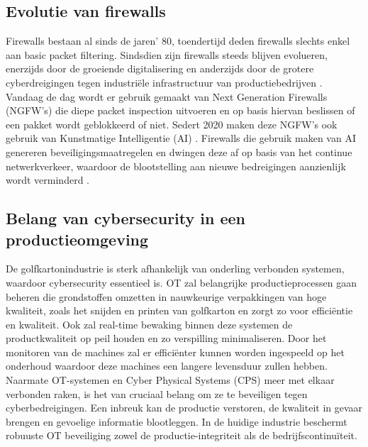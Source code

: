 \subsection{Evolutie van firewalls}
Firewalls bestaan al sinds de jaren’ 80, toendertijd deden firewalls slechts enkel aan basic packet filtering. Sindsdien zijn firewalls steeds blijven evolueren, enerzijds door de groeiende digitalisering en anderzijds door de grotere cyberdreigingen tegen industriële infrastructuur van productiebedrijven \autocite{Wusteney2021}. 
Vandaag de dag wordt er gebruik gemaakt van Next Generation Firewalls (NGFW’s) die diepe packet inspection uitvoeren en op basis hiervan beslissen of een pakket wordt geblokkeerd of niet. Sedert 2020 maken deze NGFW’s ook gebruik van Kunstmatige Intelligentie (AI) \textcite{Ahmadi2023}. Firewalls die gebruik maken van AI genereren beveiligingsmaatregelen en dwingen deze af op basis van het continue netwerkverkeer, waardoor de blootstelling aan nieuwe bedreigingen aanzienlijk wordt verminderd \textcite{PaloAltoFW2024}.

  
\subsection{Belang van cybersecurity in een productieomgeving}

De golfkartonindustrie is sterk afhankelijk van onderling verbonden systemen, waardoor cybersecurity essentieel is. OT zal belangrijke productieprocessen gaan beheren die grondstoffen omzetten in nauwkeurige verpakkingen van hoge kwaliteit, zoals het snijden en printen van golfkarton en zorgt zo voor efficiëntie en kwaliteit. Ook zal real-time bewaking binnen deze systemen de productkwaliteit op peil houden en zo verspilling minimaliseren. Door het monitoren van de machines zal er efficiënter kunnen worden ingespeeld op het onderhoud waardoor deze machines een langere levensduur zullen hebben. Naarmate OT-systemen en Cyber Physical Systems (CPS) meer met elkaar verbonden raken, is het van cruciaal belang om ze te beveiligen tegen cyberbedreigingen. Een inbreuk kan de productie verstoren, de kwaliteit in gevaar brengen en gevoelige informatie blootleggen. In de huidige industrie beschermt robuuste OT beveiliging zowel de productie-integriteit als de bedrijfscontinuïteit. \autocite{fefco2025}

